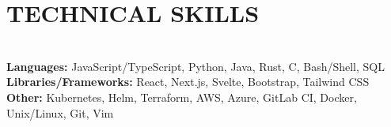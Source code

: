\documentclass[12pt,letterpaper,roman]{moderncv}
\def \scaleFont {1.13} %
\def \headingSpace {-9mm * \real{\scaleFont}} %
\def \skillSpacing {1mm} %
\begin{document}
\section{TECHNICAL SKILLS} \leavevmode \\[\headingSpace] %
{
\textbf{Languages:}
JavaScript/TypeScript,\hspace*{\skillSpacing}
Python,\hspace*{\skillSpacing}
Java,\hspace*{\skillSpacing}
Rust,\hspace*{\skillSpacing}
C,\hspace*{\skillSpacing}
Bash/Shell,\hspace*{\skillSpacing}
SQL\hspace*{\skillSpacing}
\\[-0.5mm]
\textbf{Libraries/Frameworks:}
React,\hspace*{\skillSpacing}
Next.js,\hspace*{\skillSpacing}
Svelte,\hspace*{\skillSpacing}
Bootstrap,\hspace*{\skillSpacing}
Tailwind CSS\hspace*{\skillSpacing}
\\[-0.5mm]
\textbf{Other:}
Kubernetes,\hspace*{\skillSpacing}
Helm,\hspace*{\skillSpacing}
Terraform,\hspace*{\skillSpacing}
AWS,\hspace*{\skillSpacing}
Azure,\hspace*{\skillSpacing}
GitLab CI,\hspace*{\skillSpacing}
Docker,\hspace*{\skillSpacing}
Unix/Linux,\hspace*{\skillSpacing}
Git,\hspace*{\skillSpacing}
Vim\hspace*{\skillSpacing}}

~\\[-18mm]
\end{document}
